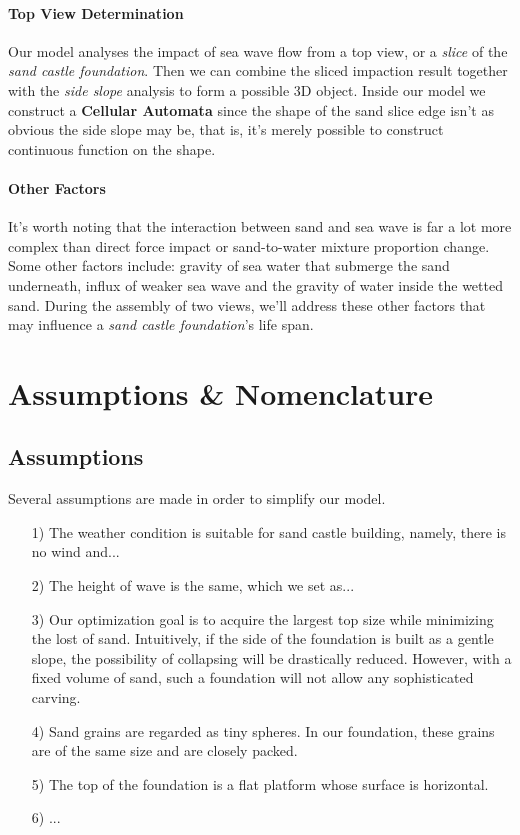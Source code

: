 \documentclass[12pt]{article}
\begin{document}
\paragraph{Top View Determination}
Our model analyses the impact of sea wave flow from a top view, or a \textit{slice} of the \textit{sand castle foundation}. Then we can combine the sliced impaction result together with the \textit{side slope} analysis to form a possible 3D object. Inside our model we construct a \textbf{Cellular Automata} since the shape of the sand slice edge isn't as obvious the side slope may be, that is, it's merely possible to construct continuous function on the shape.

\paragraph{Other Factors}
It's worth noting that the interaction between sand and sea wave is far a lot more complex than direct force impact or sand-to-water mixture proportion change. Some other factors include: gravity of sea water that submerge the sand underneath, influx of weaker sea wave and the gravity of water inside the wetted sand. During the assembly of two views, we'll address these other factors that may influence a \textit{sand castle foundation}'s life span.

\section{Assumptions \& Nomenclature}
\subsection{Assumptions}
Several assumptions are made in order to simplify our model.
\begin{itemize}
    \item [1)]
          The weather condition is suitable for sand castle building, namely, there is no wind and...
    \item [2)]
          The height of wave is the same, which we set as...
    \item [3)]
          Our optimization goal is to acquire the largest top size while minimizing the lost of sand. Intuitively, if the side of the foundation is built as a gentle slope, the possibility of collapsing will be drastically reduced. However, with a fixed volume of sand, such a foundation will not allow any sophisticated carving.
    \item [4)]
          Sand grains are regarded as tiny spheres. In our foundation, these grains are of the same size and are closely packed.
    \item [5)]
          The top of the foundation is a flat platform whose surface is horizontal.
    \item [6)]
          ...
\end{itemize}
\end{document}
